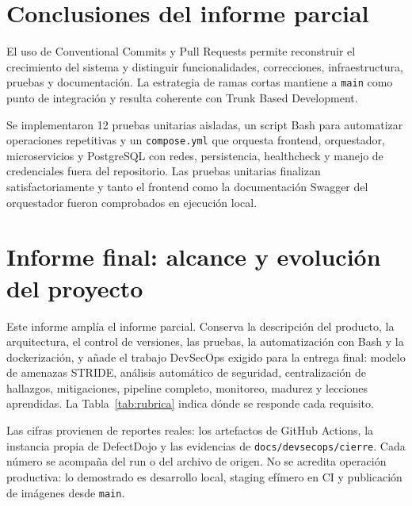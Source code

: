 \documentclass[12pt,a4paper]{article}
\begin{document}
\section{Conclusiones del informe parcial}

El uso de Conventional Commits y Pull Requests permite reconstruir el crecimiento del sistema y distinguir funcionalidades, correcciones, infraestructura, pruebas y documentación. La estrategia de ramas cortas mantiene a \texttt{main} como punto de integración y resulta coherente con Trunk Based Development.

Se implementaron 12 pruebas unitarias aisladas, un script Bash para automatizar operaciones repetitivas y un \texttt{compose.yml} que orquesta frontend, orquestador, microservicios y PostgreSQL con redes, persistencia, healthcheck y manejo de credenciales fuera del repositorio. Las pruebas unitarias finalizan satisfactoriamente y tanto el frontend como la documentación Swagger del orquestador fueron comprobados en ejecución local.

\clearpage
\section{Informe final: alcance y evolución del proyecto}
\label{sec:alcance}

Este informe amplía el informe parcial. Conserva la descripción del producto, la arquitectura, el
control de versiones, las pruebas, la automatización con Bash y la dockerización, y añade el
trabajo DevSecOps exigido para la entrega final: modelo de amenazas STRIDE, análisis automático de
seguridad, centralización de hallazgos, mitigaciones, pipeline completo, monitoreo, madurez y
lecciones aprendidas. La Tabla~\ref{tab:rubrica} indica dónde se responde cada requisito.

Las cifras provienen de reportes reales: los artefactos de GitHub Actions, la instancia propia de
DefectDojo y las evidencias de \texttt{docs/devsecops/cierre}. Cada número se acompaña del run o
del archivo de origen. No se acredita operación productiva: lo demostrado es desarrollo local,
staging efímero en CI y publicación de imágenes desde \texttt{main}.
\end{document}
